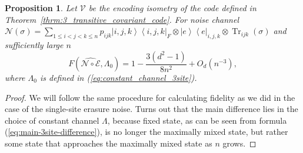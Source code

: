 \documentclass[10pt,twocolumn,superscriptaddress,aps,amsmath,amssymb,citeautoscript,floatfix,prx]{revtex4-2}
\theoremstyle{plain}
\theoremstyle{plain}
\theoremstyle{plain}
\theoremstyle{plain}
\theoremstyle{plain}
\theoremstyle{plain}
\theoremstyle{plain}
\newtheorem{smproposition}[smtheorem]{Proposition}
\theoremstyle{definition}
\theoremstyle{plain}
\begin{document}
\begin{appendix}
\begin{smproposition}\label{prop:3_transitive_fidelity}
Let $\mathcal{V}$ be the encoding isometry of the code defined in Theorem~\ref{thrm:3_transitive_covariant_code}. 
For noise channel $\mathcal{N}(\sigma)=\sum_{1 \leq i<j<k \leq n} p_{i j k} \left|i, j, k\right\rangle\left\langle i, j, k\right|_F \otimes \left| e\right\rangle\left\langle e\right|_{i, j, k} \otimes \operatorname{Tr}_{i j k}(\sigma)$ and sufficiently large $n$
\[
    F\left(\widehat{\mathcal{N} \circ \mathcal{E}}, \Lambda_0\right)=1-\frac{3\left(d^2-1\right)}{8n^2}+O_{d}\left(n^{-3}\right),
\]
where $\Lambda_0$ is defined in (\eqref{eq:constant_channel_3site}).
\end{smproposition}

\begin{proof}
    We will follow the same procedure for calculating fidelity as we did in the case of the single-site erasure noise. 
    Turns out that the main difference lies in the choice of constant channel $\Lambda$, because fixed state, as can be seen from formula (\ref{eq:main-3site-difference}), 
    is no longer the maximally mixed state, but rather some state that approaches the maximally mixed state as $n$ grows. 
    

\end{proof}
\end{appendix}
\end{document}
